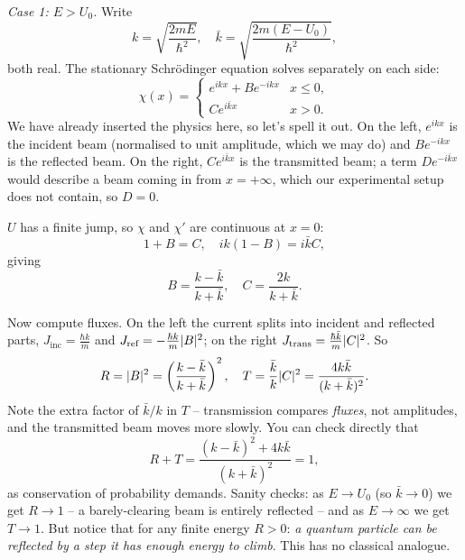 \documentclass[a4paper]{scrartcl}
\begin{document}
\emph{Case 1: $E > U_0$.} Write
$$
k = \sqrt{\frac{2mE}{\hbar^2}}, \quad \bar{k} = \sqrt{\frac{2m(E - U_0)}{\hbar^2}},
$$
both real. The stationary Schr\"odinger equation solves separately on each side:
$$
\chi(x) = \begin{cases}
    e^{ikx} + B e^{-ikx} & x \leq 0, \\
    C e^{i \bar{k} x} & x > 0.
\end{cases}
$$
We have already inserted the physics here, so let's spell it out. On the left, $e^{ikx}$ is the incident beam (normalised to unit amplitude, which we may do) and $B e^{-ikx}$ is the reflected beam. On the right, $C e^{i\bar{k}x}$ is the transmitted beam; a term $D e^{-i\bar{k}x}$ would describe a beam coming in from $x = +\infty$, which our experimental setup does not contain, so $D = 0$.

$U$ has a finite jump, so $\chi$ and $\chi'$ are continuous at $x = 0$:
$$
1 + B = C, \quad ik(1 - B) = i \bar{k} C,
$$
giving
$$
B = \frac{k - \bar{k}}{k + \bar{k}}, \quad C = \frac{2k}{k + \bar{k}}.
$$

\begin{center}
\end{center}

Now compute fluxes. On the left the current splits into incident and reflected parts, $J_{\text{inc}} = \frac{\hbar k}{m}$ and $J_{\text{ref}} = -\frac{\hbar k}{m}\lvert B\rvert^2$; on the right $J_{\text{trans}} = \frac{\hbar \bar{k}}{m} \lvert C\rvert^2$. So
$$
R = \lvert B\rvert^2 = \left( \frac{k - \bar{k}}{k + \bar{k}} \right)^2, \quad
T = \frac{\bar{k}}{k}\lvert C\rvert^2 = \frac{4 k \bar{k}}{(k + \bar{k})^2}.
$$
Note the extra factor of $\bar{k}/k$ in $T$ -- transmission compares \emph{fluxes}, not amplitudes, and the transmitted beam moves more slowly. You can check directly that
$$
R + T = \frac{(k - \bar{k})^2 + 4 k \bar{k}}{(k + \bar{k})^2} = 1,
$$
as conservation of probability demands. Sanity checks: as $E \rightarrow U_0$ (so $\bar{k} \rightarrow 0$) we get $R \rightarrow 1$ -- a barely-clearing beam is entirely reflected -- and as $E \rightarrow \infty$ we get $T \rightarrow 1$. But notice that for any finite energy $R > 0$: \emph{a quantum particle can be reflected by a step it has enough energy to climb}. This has no classical analogue.
\end{document}
